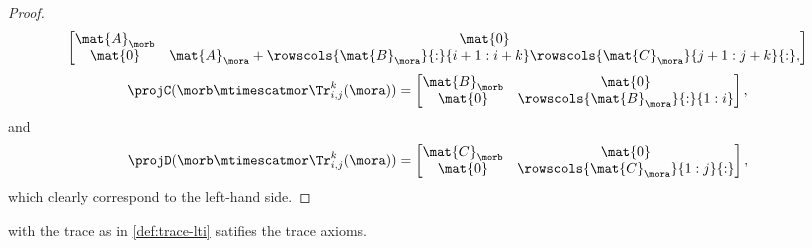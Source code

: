 {\begin{proof}
\begin{equation*}
\begin{bmatrix}
\mat{A}_\morb&\mat{0}\\
\mat{0}&\mat{A}_\mora + \rowscols{\mat{B}_\mora}{:}{i+1:i+k} \rowscols{\mat{C}_\mora}{j+1:j+k}{:},
\end{bmatrix}
\end{equation*}
%
\begin{equation*}
\projC(\morb \mtimescatmor \Tr_{i,j}^k(\mora))=\begin{bmatrix}
\mat{B}_\morb&\mat{0}\\
\mat{0}&\rowscols{\mat{B}_\mora}{:}{1:i}
\end{bmatrix},
\end{equation*}
and 
\begin{equation*}
\projD(\morb \mtimescatmor \Tr_{i,j}^k(\mora))=
\begin{bmatrix}
\mat{C}_\morb&\mat{0}\\
\mat{0}&\rowscols{\mat{C}_\mora}{1:j}{:}
\end{bmatrix},
\end{equation*}
which clearly correspond to the left-hand side.
\end{proof}
}



\begin{lemma}
\LTI with the trace as in \cref{def:trace-lti} satifies the trace axioms.
\end{lemma}

